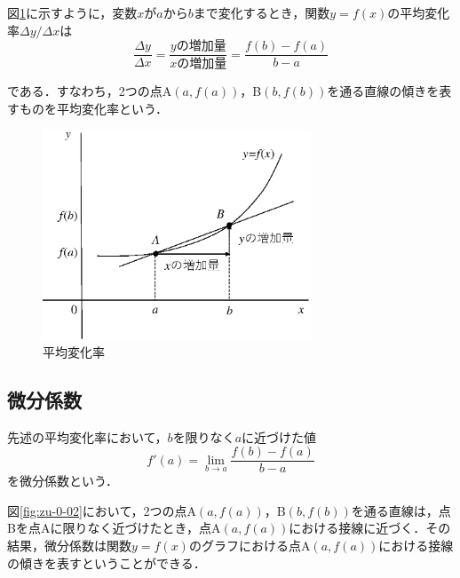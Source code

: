 図\ref{fig:zu-0-01}に示すように，変数$x$が$a$から$b$まで変化するとき，関数$y=f(x)$の平均変化率$\Delta y/\Delta x$は
\begin{equation}
\frac{\Delta y}{\Delta x}=\frac{yの増加量}{xの増加量}=\frac{f(b)-f(a)}{b-a}
\label{eqn:eqn-0-1}
\end{equation}

である．すなわち，2つの点A$(a,f(a))$，B$(b,f(b))$を通る直線の傾きを表すものを平均変化率という．

\begin{figure}[H]
\begin{center}
\includegraphics[width=80mm]{fig/zu-0-01.eps}
\end{center}
\caption{平均変化率}
\label{fig:zu-0-01}
\end{figure}

\subsection{微分係数}

先述の平均変化率において，$b$を限りなく$a$に近づけた値
\begin{equation}
f'(a)=\lim_{b \rightarrow a}\frac{f(b)-f(a)}{b-a}
\label{eqn:eqn-0-01}
\end{equation}
を微分係数という．

図\ref{fig:zu-0-02}において，2つの点A$(a,f(a))$，B$(b,f(b))$を通る直線は，点Bを点Aに限りなく近づけたとき，点A$(a,f(a))$における接線に近づく．その結果，微分係数は関数$y=f(x)$のグラフにおける点A$(a,f(a))$における接線の傾きを表すということができる．


